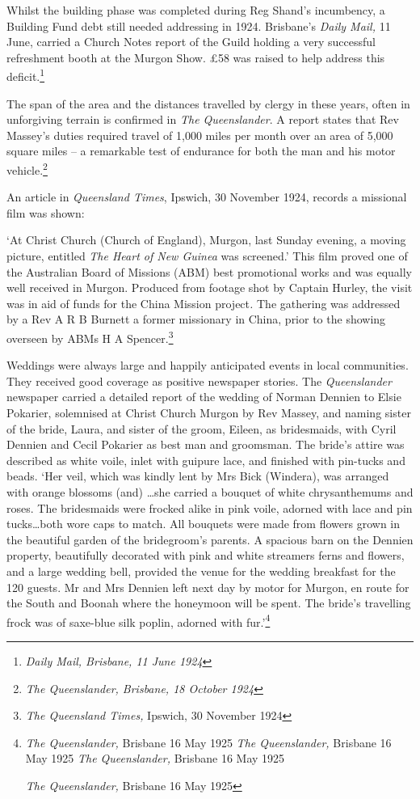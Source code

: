 Whilst the building phase was completed during Reg Shand's incumbency, a Building Fund debt still needed addressing in 1924. Brisbane's \emph{Daily Mail,} 11 June, carried a Church Notes report of the Guild holding a very successful refreshment booth at the Murgon Show. \pounds58 was raised to help address this deficit.\footnote{\emph{Daily Mail, Brisbane, 11 June 1924}}


The span of the area and the distances travelled by clergy in these years, often in unforgiving terrain is confirmed in \emph{The Queenslander}. A report states that Rev Massey's duties required travel of 1,000 miles per month over an area of 5,000 square miles -- a remarkable test of endurance for both the man and his motor vehicle.\footnote{\emph{The Queenslander, Brisbane, 18 October 1924}}


An article in \emph{Queensland Times}, Ipswich, 30 November 1924, records a missional film was shown:



`At Christ Church (Church of England), Murgon, last Sunday evening, a moving picture, entitled \emph{The Heart of New Guinea} was screened.' This film proved one of the Australian Board of Missions (ABM) best promotional works and was equally well received in Murgon. Produced from footage shot by Captain Hurley, the visit was in aid of funds for the China Mission project\emph{.} The gathering was addressed by a Rev A R B Burnett a former missionary in China, prior to the showing overseen by ABMs H A Spencer.\footnote{\emph{The Queensland Times,} Ipswich, 30 November 1924}


Weddings were always large and happily anticipated events in local communities. They received good coverage as positive newspaper stories. The \emph{Queenslander} newspaper carried a detailed report of the wedding of Norman Dennien to Elsie Pokarier, solemnised at Christ Church Murgon by Rev Massey, and naming sister of the bride, Laura, and sister of the groom, Eileen, as bridesmaids, with Cyril Dennien and Cecil Pokarier as best man and groomsman. The bride's attire was described as white voile, inlet with guipure lace, and finished with pin-tucks and beads. `Her veil, which was kindly lent by Mrs Bick (Windera), was arranged with orange blossoms (and) \ldots she carried a bouquet of white chrysanthemums and roses. The bridesmaids were frocked alike in pink voile, adorned with lace and pin tucks\ldots both wore caps to match. All bouquets were made from flowers grown in the beautiful garden of the bridegroom's parents. A spacious barn on the Dennien property, beautifully decorated with pink and white streamers ferns and flowers, and a large wedding bell, provided the venue for the wedding breakfast for the 120 guests. Mr and Mrs Dennien left next day by motor for Murgon, en route for the South and Boonah where the honeymoon will be spent. The bride's travelling frock was of saxe-blue silk poplin, adorned with fur.'\footnote{\emph{The Queenslander,} Brisbane 16 May 1925 \emph{The Queenslander,} Brisbane 16 May 1925 \emph{The Queenslander,} Brisbane 16 May 1925


  \emph{The Queenslander,} Brisbane 16 May 1925}



